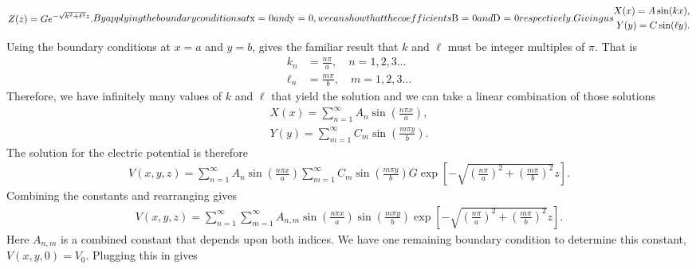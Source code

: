 \begin{subequations}
\begin{align}
  Z(z) = G e^{-\sqrt{ k^2 + \ell^2 } z} .
\end{align}
By applying the boundary conditions at $x = 0$ and $y = 0$, we can show that the coefficients $B = 0$ and $D = 0$ respectively. Giving us
\begin{align}
  X(x) = A \sin( k x ) , \\
  Y(y) = C \sin( \ell y ) .
\end{align}
\end{subequations}
Using the boundary conditions at $x = a$ and $y = b$, gives the familiar result that $k$ and $\ell$ must be integer multiples of $\pi$. That is
\begin{subequations}
\begin{align}
  k_n &= \frac{n\pi}{a}, \quad n = 1, 2, 3 \ldots \\
  \ell_n &= \frac{m\pi}{b}, \quad m = 1, 2, 3 \ldots 
\end{align}
\end{subequations}
Therefore, we have infinitely many values of $k$ and $\ell$ that yield the solution and we can take a linear combination of those solutions
\begin{subequations}
\begin{align}
  X(x) = \sum_{n=1}^\infty A_n \sin \left( \frac{ n \pi x }{ a } \right) , \\
  Y(y) = \sum_{m=1}^\infty C_m \sin \left( \frac{ m \pi y }{ b } \right) .
\end{align}
\end{subequations}
The solution for the electric potential is therefore
\begin{align}
  V(x,y,z) = \sum_{n=1}^\infty A_n \sin \left( \frac{ n \pi x }{ a } \right) \sum_{m=1}^\infty C_m \sin \left( \frac{ m \pi y }{ b } \right) 
  G \exp \left[ -\sqrt{ \left( \frac{ n \pi }{ a } \right)^2 + \left( \frac{ m \pi }{ b } \right)^2 }  z \right] . \nonumber
\end{align}
Combining the constants and rearranging gives
\begin{align}
  V(x,y,z) = \sum_{n=1}^\infty \sum_{m=1}^\infty A_{n,m} \sin \left( \frac{ n \pi x }{ a } \right)  \sin \left( \frac{ m \pi y }{ b } \right) 
  \exp \left[ -\sqrt{ \left( \frac{ n \pi }{ a } \right)^2 + \left( \frac{ m \pi }{ b } \right)^2 }  z \right] . 
\end{align}
Here $A_{n,m}$ is a combined constant that depends upon both indices. We have one remaining boundary condition to determine this constant, $V(x,y,0) = V_0$. Plugging this in gives
